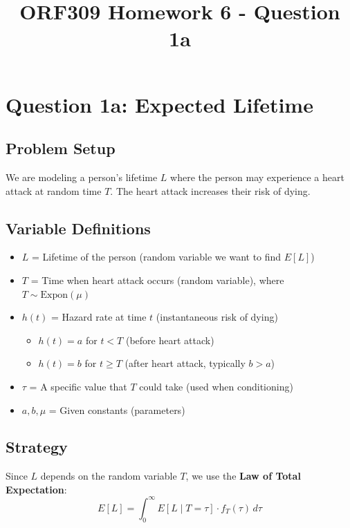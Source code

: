 \documentclass[11pt]{article}
\title{ORF309 Homework 6 - Question 1a}
\author{}
\date{}
\begin{document}
\maketitle

\section*{Question 1a: Expected Lifetime}

\subsection*{Problem Setup}

We are modeling a person's lifetime $L$ where the person may experience a heart attack at random time $T$. The heart attack increases their risk of dying.

\subsection*{Variable Definitions}

\begin{itemize}
    \item $L$ = Lifetime of the person (random variable we want to find $E[L]$)
    \item $T$ = Time when heart attack occurs (random variable), where $T \sim \text{Expon}(\mu)$
    \item $h(t)$ = Hazard rate at time $t$ (instantaneous risk of dying)
    \begin{itemize}
        \item $h(t) = a$ for $t < T$ (before heart attack)
        \item $h(t) = b$ for $t \geq T$ (after heart attack, typically $b > a$)
    \end{itemize}
    \item $\tau$ = A specific value that $T$ could take (used when conditioning)
    \item $a, b, \mu$ = Given constants (parameters)
\end{itemize}

\subsection*{Strategy}

Since $L$ depends on the random variable $T$, we use the \textbf{Law of Total Expectation}:
\[
E[L] = \int_0^\infty E[L \mid T = \tau] \cdot f_T(\tau) \, d\tau
\]
\end{document}
